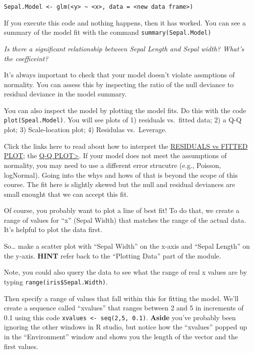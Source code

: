 \documentclass[]{book}
\begin{document}
\texttt{Sepal.Model\ \textless{}-\ glm(\textless{}y\textgreater{}\ \textasciitilde{}\ \textless{}x\textgreater{},\ data\ =\ \textless{}new\ data\ frame\textgreater{})}

If you execute this code and nothing happens, then it has worked. You can see a summary of the model fit with the command \texttt{summary(Sepal.Model)}

\emph{Is there a significant relationship between Sepal Length and Sepal width? What's the coefficeint?}

It's always important to check that your model doesn't violate assmptions of normality. You can assess this by inspecting the ratio of the null deviance to residual deviance in the model summary.

You can also inspect the model by plotting the model fits. Do this with the code \texttt{plot(Speal.Model)}. You will see plots of 1) residuals vs.~fitted data; 2) a Q-Q plot; 3) Scale-location plot; 4) Residulas vs.~Leverage.

Click the links here to read about how to interpret the \href{https://stats.stackexchange.com/questions/76226/interpreting-the-residuals-vs-fitted-values-plot-for-verifying-the-assumptions}{RESIDUALS vs FITTED PLOT}; the \href{https://stats.stackexchange.com/questions/101274/how-to-interpret-a-qq-plot}{Q-Q PLOT\textgreater{}}. If your model does not meet the assumptions of normality, you may need to use a different error strucutre (e.g., Poisson, logNormal). Going into the whys and hows of that is beyond the scope of this course. The fit here is slightly skewed but the null and residual deviances are small enought that we can accept this fit.

Of course, you probably want to plot a line of best fit! To do that, we create a range of values for ``x'' (Sepal Width) that matches the range of the actual data. It's helpful to plot the data first.

So\ldots{} make a scatter plot with ``Sepal Width'' on the x-axis and ``Sepal Length'' on the y-axis. \textbf{HINT} refer back to the ``Plotting Data'' part of the module.

Note, you could also query the data to see what the range of real x values are by typing \texttt{range(iris\$Sepal.Width)}.

Then specify a range of values that fall within this for fitting the model. We'll create a sequence called ``xvalues'' that ranges between 2 and 5 in increments of 0.1 using this code \texttt{xvalues\ \textless{}-\ seq(2,5,\ 0.1)}. \textbf{Aside} you've probably been ignoring the other windows in R studio, but notice how the ``xvalues'' popped up in the ``Environment'' window and shows you the length of the vector and the first values.
\end{document}

